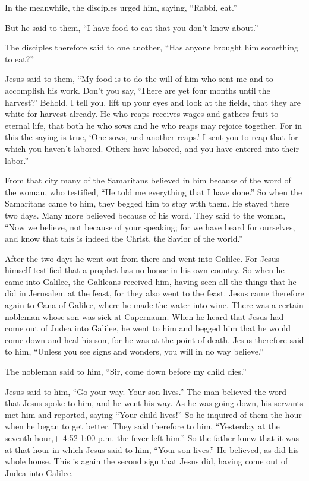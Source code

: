  In the meanwhile, the disciples urged him, saying,
``Rabbi, eat.''

 But he said to them, ``I have food to eat that you don't
know about.''

 The disciples therefore said to one another, ``Has anyone
brought him something to eat?''

 Jesus said to them, ``My food is to do the will of him who
sent me and to accomplish his work.  Don't you say, `There
are yet four months until the harvest?' Behold, I tell you, lift up your
eyes and look at the fields, that they are white for harvest already.
 He who reaps receives wages and gathers fruit to eternal
life, that both he who sows and he who reaps may rejoice together.
 For in this the saying is true, `One sows, and another
reaps.'  I sent you to reap that for which you haven't
labored. Others have labored, and you have entered into their labor.''

 From that city many of the Samaritans believed in him
because of the word of the woman, who testified, ``He told me everything
that I have done.''  So when the Samaritans came to him,
they begged him to stay with them. He stayed there two days.
 Many more believed because of his word.  They
said to the woman, ``Now we believe, not because of your speaking; for
we have heard for ourselves, and know that this is indeed the Christ,
the Savior of the world.''

 After the two days he went out from there and went into
Galilee.  For Jesus himself testified that a prophet has no
honor in his own country.  So when he came into Galilee,
the Galileans received him, having seen all the things that he did in
Jerusalem at the feast, for they also went to the feast. 
Jesus came therefore again to Cana of Galilee, where he made the water
into wine. There was a certain nobleman whose son was sick at Capernaum.
 When he heard that Jesus had come out of Judea into
Galilee, he went to him and begged him that he would come down and heal
his son, for he was at the point of death.  Jesus therefore
said to him, ``Unless you see signs and wonders, you will in no way
believe.''

 The nobleman said to him, ``Sir, come down before my child
dies.''

 Jesus said to him, ``Go your way. Your son lives.'' The
man believed the word that Jesus spoke to him, and he went his way.
 As he was going down, his servants met him and reported,
saying ``Your child lives!''  So he inquired of them the
hour when he began to get better. They said therefore to him,
``Yesterday at the seventh hour,+ 4:52 1:00 p.m. the fever left him.''
 So the father knew that it was at that hour in which Jesus
said to him, ``Your son lives.'' He believed, as did his whole house.
 This is again the second sign that Jesus did, having come
out of Judea into Galilee.

